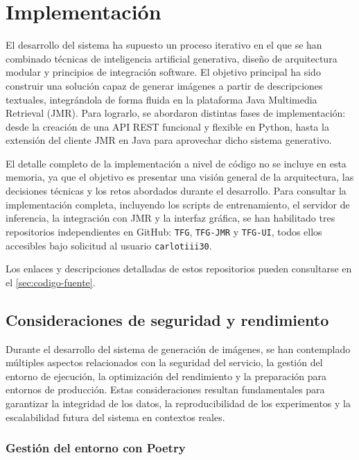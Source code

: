 \section{Implementación}

El desarrollo del sistema ha supuesto un proceso iterativo en el que se han combinado técnicas de inteligencia artificial generativa, diseño de arquitectura modular y principios de integración software. El objetivo principal ha sido construir una solución capaz de generar imágenes a partir de descripciones textuales, integrándola de forma fluida en la plataforma Java Multimedia Retrieval (JMR). Para lograrlo, se abordaron distintas fases de implementación: desde la creación de una API REST funcional y flexible en Python, hasta la extensión del cliente JMR en Java para aprovechar dicho sistema generativo. 

El detalle completo de la implementación a nivel de código no se incluye en esta memoria, ya que el objetivo es presentar una visión general de la arquitectura, las decisiones técnicas y los retos abordados durante el desarrollo. Para consultar la implementación completa, incluyendo los scripts de entrenamiento, el servidor de inferencia, la integración con JMR y la interfaz gráfica, se han habilitado tres repositorios independientes en GitHub: \texttt{TFG}, \texttt{TFG-JMR} y \texttt{TFG-UI}, todos ellos accesibles bajo solicitud al usuario \texttt{carlotiii30}.

Los enlaces y descripciones detalladas de estos repositorios pueden consultarse en el \autoref{sec:codigo-fuente}.




\subsection{Consideraciones de seguridad y rendimiento}

Durante el desarrollo del sistema de generación de imágenes, se han contemplado múltiples aspectos relacionados con la seguridad del servicio, la gestión del entorno de ejecución, la optimización del rendimiento y la preparación para entornos de producción. Estas consideraciones resultan fundamentales para garantizar la integridad de los datos, la reproducibilidad de los experimentos y la escalabilidad futura del sistema en contextos reales.

\subsubsection{Gestión del entorno con Poetry}

